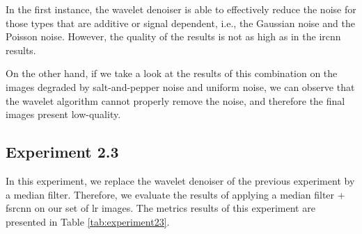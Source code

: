 In the first instance, the wavelet denoiser is able to effectively reduce the noise for those types that are additive or signal dependent, i.e., the Gaussian noise and the Poisson noise. However, the quality of the results is not as high as in the \gls{ircnn} results. 

On the other hand, if we take a look at the results of this combination on the images degraded by salt-and-pepper noise and uniform noise, we can observe that the wavelet algorithm cannot properly remove the noise, and therefore the final images present low-quality.

\subsection{Experiment 2.3}
In this experiment, we replace the wavelet denoiser of the previous experiment by a median filter. Therefore, we evaluate the results of applying a median filter + \gls{fsrcnn} on our set of \gls{lr} images. The metrics results of this experiment are presented in Table \ref{tab:experiment23}.

